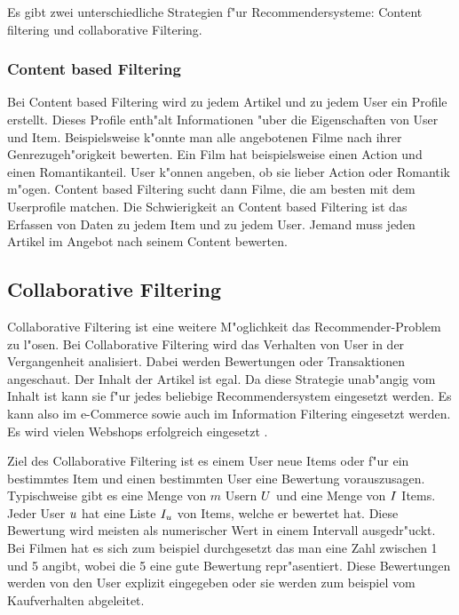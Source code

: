 \documentclass[a4paper, 12pt]{article}
\begin{document}
Es gibt zwei unterschiedliche Strategien f"ur Recommendersysteme: Content filtering und collaborative Filtering. 

\subsubsection{Content based Filtering}
\label{sec:contentbased}

Bei Content based Filtering wird zu jedem Artikel und zu jedem User ein Profile erstellt. Dieses Profile enth"alt Informationen "uber die Eigenschaften von User und Item. Beispielsweise k"onnte man alle angebotenen Filme nach ihrer Genrezugeh"origkeit bewerten. Ein Film hat beispielsweise einen Action und einen Romantikanteil. User k"onnen angeben, ob sie lieber Action oder Romantik m"ogen. Content based Filtering sucht dann Filme, die am besten mit dem Userprofile matchen. Die Schwierigkeit an Content based Filtering ist das Erfassen von Daten zu jedem Item und zu jedem User. Jemand muss jeden Artikel im Angebot nach seinem Content bewerten.

\subsection{Collaborative Filtering}
\label{sec:collaborativefiltering}

Collaborative Filtering ist eine weitere M"oglichkeit das Re\-commender-Prob\-lem zu l"osen. Bei Collaborative Filtering wird das Verhalten von User in der Vergangenheit analisiert. Dabei werden Bewertungen oder Transaktionen angeschaut. Der Inhalt der Artikel ist egal. Da diese Strategie unab"angig vom Inhalt ist kann sie f"ur jedes beliebige Recommendersystem eingesetzt werden. Es kann also im e-Commerce sowie auch im Information Filtering eingesetzt werden.  Es wird vielen Webshops erfolgreich eingesetzt \cite{sarwar01}. 

Ziel des Collaborative Filtering ist es einem User neue Items oder f"ur ein bestimmtes Item und einen bestimmten User eine Bewertung vorauszusagen. Typischweise gibt es eine Menge von $m$ Usern  $\mathnormal{U}$ und eine Menge von $ \mathnormal{I} $ Items. Jeder User $\mathnormal{u}$ hat eine Liste $\mathnormal{I_u}$ von Items, welche er bewertet hat. Diese Bewertung wird meisten als numerischer Wert in einem Intervall ausgedr"uckt. Bei Filmen hat es sich zum beispiel durchgesetzt das man eine Zahl zwischen 1 und 5 angibt, wobei die 5 eine gute Bewertung repr"asentiert. Diese Bewertungen werden von den User explizit eingegeben oder sie werden zum beispiel vom Kaufverhalten abgeleitet.
\end{document}

